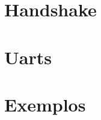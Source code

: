 \documentclass[12pt]{article} %
\begin{document}
\section*{Handshake}
\section*{Uarts}
\section*{Exemplos}
\end{document}
